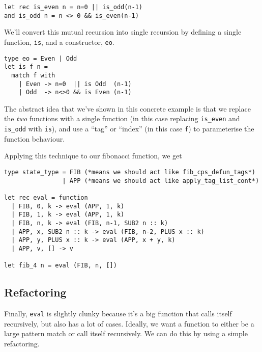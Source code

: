 \begin{code}
\label{code:eo-mutual-recursion}
\begin{verbatim}
let rec is_even n = n=0 || is_odd(n-1)
and is_odd n = n <> 0 && is_even(n-1)
\end{verbatim}
\end{code}

We'll convert this mutual recursion into single recursion by defining a single function, \texttt{is}, and a constructor, \texttt{eo}.

\begin{code}
\label{code:eo-mutual-recursion-elimination}
\begin{verbatim}
type eo = Even | Odd
let is f n = 
  match f with
    | Even -> n=0  || is Odd  (n-1)
    | Odd  -> n<>0 && is Even (n-1)
\end{verbatim}
\end{code}

The abstract idea that we've shown in this concrete example is that we replace the \emph{two} functions with a single function (in this case replacing \texttt{is\_even} and \texttt{is\_odd} with \texttt{is}), and use a ``tag'' or ``index'' (in this case \texttt{f}) to parameterise the function behaviour.

Applying this technique to our fibonacci function, we get

\begin{code}
\label{code:fib-mutual-recursion-elimination}
\begin{verbatim}
type state_type = FIB (*means we should act like fib_cps_defun_tags*)
                | APP (*means we should act like apply_tag_list_cont*)

let rec eval = function
  | FIB, 0, k -> eval (APP, 1, k)
  | FIB, 1, k -> eval (APP, 1, k)
  | FIB, n, k -> eval (FIB, n-1, SUB2 n :: k)
  | APP, x, SUB2 n :: k -> eval (FIB, n-2, PLUS x :: k)
  | APP, y, PLUS x :: k -> eval (APP, x + y, k)
  | APP, v, [] -> v

let fib_4 n = eval (FIB, n, [])
\end{verbatim}
\end{code}


\subsection{Refactoring}\label{subsection:refactoring}
Finally, \texttt{eval} is slightly clunky because it's a big function that calls itself recursively, but also has a lot of cases. Ideally, we want a function to either be a large pattern match or call itself recursively. We can do this by using a simple refactoring. 

